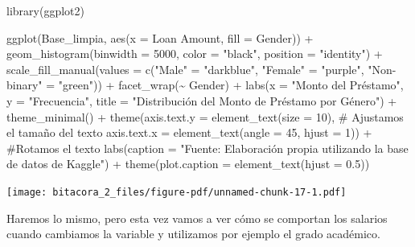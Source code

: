 \documentclass[
  letterpaper,
  DIV=11,
  numbers=noendperiod]{scrreprt}
\newenvironment{Shaded}{\begin{snugshade}}{\end{snugshade}}
\newcommand{\AttributeTok}[1]{\textcolor[rgb]{0.40,0.45,0.13}{#1}}
\newcommand{\CommentTok}[1]{\textcolor[rgb]{0.37,0.37,0.37}{#1}}
\newcommand{\DecValTok}[1]{\textcolor[rgb]{0.68,0.00,0.00}{#1}}
\newcommand{\FloatTok}[1]{\textcolor[rgb]{0.68,0.00,0.00}{#1}}
\newcommand{\FunctionTok}[1]{\textcolor[rgb]{0.28,0.35,0.67}{#1}}
\newcommand{\NormalTok}[1]{\textcolor[rgb]{0.00,0.23,0.31}{#1}}
\newcommand{\OtherTok}[1]{\textcolor[rgb]{0.00,0.23,0.31}{#1}}
\newcommand{\SpecialCharTok}[1]{\textcolor[rgb]{0.37,0.37,0.37}{#1}}
\newcommand{\StringTok}[1]{\textcolor[rgb]{0.13,0.47,0.30}{#1}}
\begin{document}
\begin{Shaded}
\begin{Highlighting}[]
\FunctionTok{library}\NormalTok{(ggplot2)}

\FunctionTok{ggplot}\NormalTok{(Base\_limpia, }\FunctionTok{aes}\NormalTok{(}\AttributeTok{x =} \StringTok{\textasciigrave{}}\AttributeTok{Loan Amount}\StringTok{\textasciigrave{}}\NormalTok{, }\AttributeTok{fill =}\NormalTok{ Gender)) }\SpecialCharTok{+}  
  \FunctionTok{geom\_histogram}\NormalTok{(}\AttributeTok{binwidth =} \DecValTok{5000}\NormalTok{, }\AttributeTok{color =} \StringTok{"black"}\NormalTok{, }\AttributeTok{position =} \StringTok{"identity"}\NormalTok{) }\SpecialCharTok{+}  
  \FunctionTok{scale\_fill\_manual}\NormalTok{(}\AttributeTok{values =} \FunctionTok{c}\NormalTok{(}\StringTok{"Male"} \OtherTok{=} \StringTok{"darkblue"}\NormalTok{, }\StringTok{"Female"} \OtherTok{=} \StringTok{"purple"}\NormalTok{, }\StringTok{"Non{-}binary"} \OtherTok{=} \StringTok{"green"}\NormalTok{)) }\SpecialCharTok{+}  
  \FunctionTok{facet\_wrap}\NormalTok{(}\SpecialCharTok{\textasciitilde{}}\NormalTok{ Gender) }\SpecialCharTok{+}  
  \FunctionTok{labs}\NormalTok{(}\AttributeTok{x =} \StringTok{"Monto del Préstamo"}\NormalTok{, }\AttributeTok{y =} \StringTok{"Frecuencia"}\NormalTok{, }\AttributeTok{title =} \StringTok{"Distribución del Monto de Préstamo por Género"}\NormalTok{) }\SpecialCharTok{+} 
  \FunctionTok{theme\_minimal}\NormalTok{() }\SpecialCharTok{+}
  \FunctionTok{theme}\NormalTok{(}\AttributeTok{axis.text.y =} \FunctionTok{element\_text}\NormalTok{(}\AttributeTok{size =} \DecValTok{10}\NormalTok{), }\CommentTok{\# Ajustamos el tamaño del texto}
        \AttributeTok{axis.text.x =} \FunctionTok{element\_text}\NormalTok{(}\AttributeTok{angle =} \DecValTok{45}\NormalTok{, }\AttributeTok{hjust =} \DecValTok{1}\NormalTok{)) }\SpecialCharTok{+} \CommentTok{\#Rotamos el texto}
  \FunctionTok{labs}\NormalTok{(}\AttributeTok{caption =} \StringTok{"Fuente: Elaboración propia utilizando la base de datos de Kaggle"}\NormalTok{) }\SpecialCharTok{+}
\FunctionTok{theme}\NormalTok{(}\AttributeTok{plot.caption =} \FunctionTok{element\_text}\NormalTok{(}\AttributeTok{hjust =} \FloatTok{0.5}\NormalTok{)) }
\end{Highlighting}
\end{Shaded}

\texttt{[image: bitacora\_2\_files/figure-pdf/unnamed-chunk-17-1.pdf]}

Haremos lo mismo, pero esta vez vamos a ver cómo se comportan los
salarios cuando cambiamos la variable y utilizamos por ejemplo el grado
académico.
\end{document}
